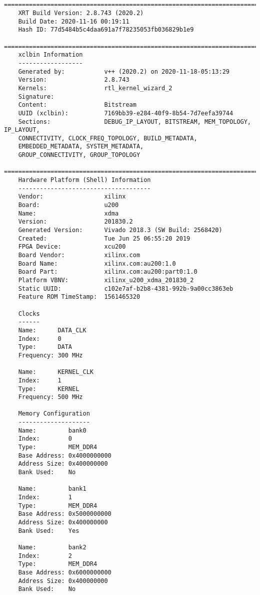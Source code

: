 \lstset{language=Pascal}          %
\begin{lstlisting}[caption=Содержимое файла vinc.xclbin.info для измененного проекта, label={infof2}]
	
	==============================================================================
	XRT Build Version: 2.8.743 (2020.2)
	Build Date: 2020-11-16 00:19:11
	Hash ID: 77d5484b5c4daa691a7f78235053fb036829b1e9
	==============================================================================
	xclbin Information
	------------------
	Generated by:           v++ (2020.2) on 2020-11-18-05:13:29
	Version:                2.8.743
	Kernels:                rtl_kernel_wizard_2
	Signature:              
	Content:                Bitstream
	UUID (xclbin):          7169bb39-e284-40f9-8b54-7d7eefa39744
	Sections:               DEBUG_IP_LAYOUT, BITSTREAM, MEM_TOPOLOGY, IP_LAYOUT, 
	CONNECTIVITY, CLOCK_FREQ_TOPOLOGY, BUILD_METADATA, 
	EMBEDDED_METADATA, SYSTEM_METADATA, 
	GROUP_CONNECTIVITY, GROUP_TOPOLOGY
	==============================================================================
	Hardware Platform (Shell) Information
	-------------------------------------
	Vendor:                 xilinx
	Board:                  u200
	Name:                   xdma
	Version:                201830.2
	Generated Version:      Vivado 2018.3 (SW Build: 2568420)
	Created:                Tue Jun 25 06:55:20 2019
	FPGA Device:            xcu200
	Board Vendor:           xilinx.com
	Board Name:             xilinx.com:au200:1.0
	Board Part:             xilinx.com:au200:part0:1.0
	Platform VBNV:          xilinx_u200_xdma_201830_2
	Static UUID:            c102e7af-b2b8-4381-992b-9a00cc3863eb
	Feature ROM TimeStamp:  1561465320
	
	Clocks
	------
	Name:      DATA_CLK
	Index:     0
	Type:      DATA
	Frequency: 300 MHz
	
	Name:      KERNEL_CLK
	Index:     1
	Type:      KERNEL
	Frequency: 500 MHz
	
	Memory Configuration
	--------------------
	Name:         bank0
	Index:        0
	Type:         MEM_DDR4
	Base Address: 0x4000000000
	Address Size: 0x400000000
	Bank Used:    No
	
	Name:         bank1
	Index:        1
	Type:         MEM_DDR4
	Base Address: 0x5000000000
	Address Size: 0x400000000
	Bank Used:    Yes
	
	Name:         bank2
	Index:        2
	Type:         MEM_DDR4
	Base Address: 0x6000000000
	Address Size: 0x400000000
	Bank Used:    No
	

\end{lstlisting}
